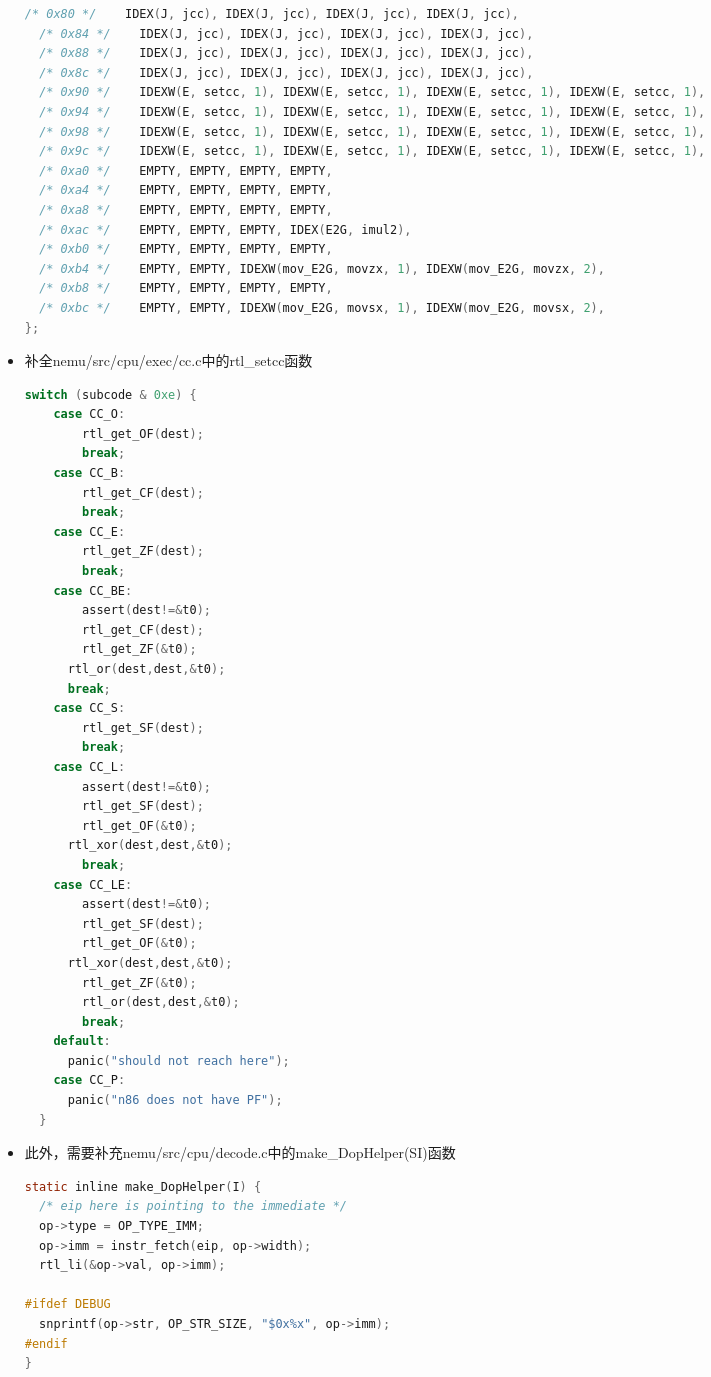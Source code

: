 \documentclass[UTF8,a4paper,10pt]{ctexart}
\begin{document}
\begin{itemize}
\begin{lstlisting}[language = C]
  /* 0x80 */	IDEX(J, jcc), IDEX(J, jcc), IDEX(J, jcc), IDEX(J, jcc),
  /* 0x84 */	IDEX(J, jcc), IDEX(J, jcc), IDEX(J, jcc), IDEX(J, jcc),
  /* 0x88 */	IDEX(J, jcc), IDEX(J, jcc), IDEX(J, jcc), IDEX(J, jcc),
  /* 0x8c */	IDEX(J, jcc), IDEX(J, jcc), IDEX(J, jcc), IDEX(J, jcc),
  /* 0x90 */	IDEXW(E, setcc, 1), IDEXW(E, setcc, 1), IDEXW(E, setcc, 1), IDEXW(E, setcc, 1),
  /* 0x94 */	IDEXW(E, setcc, 1), IDEXW(E, setcc, 1), IDEXW(E, setcc, 1), IDEXW(E, setcc, 1),
  /* 0x98 */	IDEXW(E, setcc, 1), IDEXW(E, setcc, 1), IDEXW(E, setcc, 1), IDEXW(E, setcc, 1),
  /* 0x9c */	IDEXW(E, setcc, 1), IDEXW(E, setcc, 1), IDEXW(E, setcc, 1), IDEXW(E, setcc, 1),
  /* 0xa0 */	EMPTY, EMPTY, EMPTY, EMPTY,
  /* 0xa4 */	EMPTY, EMPTY, EMPTY, EMPTY,
  /* 0xa8 */	EMPTY, EMPTY, EMPTY, EMPTY,
  /* 0xac */	EMPTY, EMPTY, EMPTY, IDEX(E2G, imul2),
  /* 0xb0 */	EMPTY, EMPTY, EMPTY, EMPTY,
  /* 0xb4 */	EMPTY, EMPTY, IDEXW(mov_E2G, movzx, 1), IDEXW(mov_E2G, movzx, 2),
  /* 0xb8 */	EMPTY, EMPTY, EMPTY, EMPTY,
  /* 0xbc */	EMPTY, EMPTY, IDEXW(mov_E2G, movsx, 1), IDEXW(mov_E2G, movsx, 2),
};
\end{lstlisting}
\item 补全nemu/src/cpu/exec/cc.c中的rtl\_setcc函数
\begin{lstlisting}[language = C]
  switch (subcode & 0xe) {
    case CC_O:
	    rtl_get_OF(dest);
	    break;	
    case CC_B:
	    rtl_get_CF(dest);
	    break;
    case CC_E:
	    rtl_get_ZF(dest);
	    break;
    case CC_BE:
	    assert(dest!=&t0);
	    rtl_get_CF(dest);
	    rtl_get_ZF(&t0);
      rtl_or(dest,dest,&t0);
      break;
    case CC_S:
	    rtl_get_SF(dest);
	    break;
    case CC_L:
	    assert(dest!=&t0);
	    rtl_get_SF(dest);
	    rtl_get_OF(&t0);
      rtl_xor(dest,dest,&t0);
	    break;
    case CC_LE:
	    assert(dest!=&t0);
	    rtl_get_SF(dest);
	    rtl_get_OF(&t0);
      rtl_xor(dest,dest,&t0);
	    rtl_get_ZF(&t0);
	    rtl_or(dest,dest,&t0);
	    break;
    default: 
      panic("should not reach here");
    case CC_P: 
      panic("n86 does not have PF");
  }
\end{lstlisting}
\item 此外，需要补充nemu/src/cpu/decode.c中的make\_DopHelper(SI)函数
\begin{lstlisting}[language = C]
static inline make_DopHelper(I) {
  /* eip here is pointing to the immediate */
  op->type = OP_TYPE_IMM;
  op->imm = instr_fetch(eip, op->width);
  rtl_li(&op->val, op->imm);

#ifdef DEBUG
  snprintf(op->str, OP_STR_SIZE, "$0x%x", op->imm);
#endif
}
\end{lstlisting}

\end{itemize}
\end{document}
